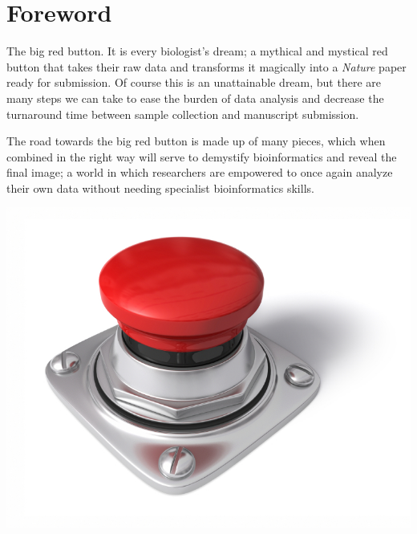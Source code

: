 \chapter*{Foreword}
{}
\setlength\parindent{0pt}
\vspace{-1cm}
The big red button. It is every biologist's dream; a mythical and mystical red button that takes their raw data and transforms it magically into a \emph{Nature} paper ready for submission. Of course this is an unattainable dream, but there are many steps we can take to ease the burden of data analysis and decrease the
turnaround time between sample collection and manuscript submission.

The road towards the big red button is made up of many pieces, which when combined in the right way will serve to demystify bioinformatics and reveal the final image; a world in which researchers are empowered to once again analyze their own data without needing specialist bioinformatics skills.


\begin{center}
\includegraphics[scale=0.25]{chapters/images/redbutton.jpg}
\end{center}
